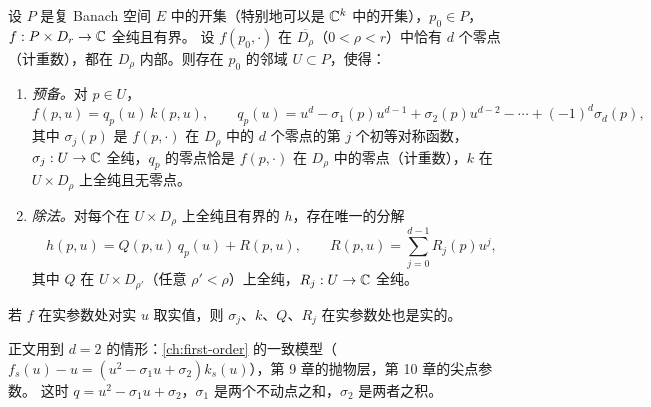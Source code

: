 \begin{theorem}\label{thm:weierstrass-prep}
设 $P$ 是复 Banach 空间 $E$ 中的开集（特别地可以是 $\mathbb{C}^k$ 中的开集），$p_0\in P$，$f:P\times D_r\to\mathbb{C}$ 全纯且有界。
设 $f(p_0,\cdot)$ 在 $\overline{D_\rho}$（$0<\rho<r$）中恰有 $d$ 个零点（计重数），都在 $D_\rho$ 内部。则存在 $p_0$ 的邻域 $U\subset P$，使得：
\begin{enumerate}
\item \emph{预备。}对 $p\in U$，
  \[
    f(p,u)=q_p(u)\,k(p,u),\qquad q_p(u)=u^d-\sigma_1(p)u^{d-1}+\sigma_2(p)u^{d-2}-\cdots+(-1)^d\sigma_d(p),
  \]
  其中 $\sigma_j(p)$ 是 $f(p,\cdot)$ 在 $D_\rho$ 中的 $d$ 个零点的第 $j$ 个初等对称函数，$\sigma_j:U\to\mathbb{C}$ 全纯，$q_p$ 的零点恰是 $f(p,\cdot)$ 在 $D_\rho$ 中的零点（计重数），$k$ 在 $U\times D_\rho$ 上全纯且无零点。
\item \emph{除法。}对每个在 $U\times D_\rho$ 上全纯且有界的 $h$，存在唯一的分解
  \[
    h(p,u)=Q(p,u)\,q_p(u)+R(p,u),\qquad R(p,u)=\sum_{j=0}^{d-1}R_j(p)u^j ,
  \]
  其中 $Q$ 在 $U\times D_{\rho'}$（任意 $\rho'<\rho$）上全纯，$R_j:U\to\mathbb{C}$ 全纯。
\end{enumerate}
若 $f$ 在实参数处对实 $u$ 取实值，则 $\sigma_j$、$k$、$Q$、$R_j$ 在实参数处也是实的。
\end{theorem}

正文用到 $d=2$ 的情形：\cref{ch:first-order} 的一致模型（$f_s(u)-u=(u^2-\sigma_1u+\sigma_2)k_s(u)$），第 9 章的抛物层，第 10 章的尖点参数。
这时 $q=u^2-\sigma_1u+\sigma_2$，$\sigma_1$ 是两个不动点之和，$\sigma_2$ 是两者之积。

